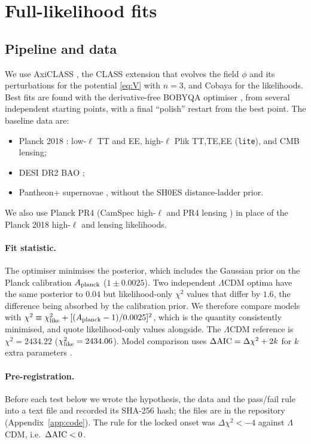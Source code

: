 \documentclass[11pt]{article}
\begin{document}
\section{Full-likelihood fits}\label{sec:fits}

\subsection{Pipeline and data}
We use AxiCLASS \cite{poulin2018,blas2011}, the CLASS extension that evolves the field
$\phi$ and its perturbations for the potential \eqref{eq:V} with $n=3$, and Cobaya
\cite{torrado2021} for the likelihoods. Best fits are found with the derivative-free
BOBYQA optimiser \cite{powell2009,cartis2019}, from several independent starting points,
with a final ``polish'' restart from the best point. The baseline data are:
\begin{itemize}
\item Planck 2018 \cite{planck2020like,planck2020lens}: low-$\ell$ TT and EE, high-$\ell$
Plik TT,TE,EE (\texttt{lite}), and CMB lensing;
\item DESI DR2 BAO \cite{desi2025};
\item Pantheon+ supernovae \cite{scolnic2022,brout2022}, without the SH0ES distance-ladder prior.
\end{itemize}
We also use Planck PR4 (CamSpec high-$\ell$ \cite{rosenberg2022} and PR4 lensing
\cite{carron2022}) in place of the Planck 2018 high-$\ell$ and lensing likelihoods.

\paragraph{Fit statistic.} The optimiser minimises the posterior, which includes the
Gaussian prior on the Planck calibration $A_{\rm planck}$ ($1\pm0.0025$). Two independent
$\Lambda$CDM optima have the same posterior to $0.04$ but likelihood-only $\chi^2$ values that
differ by $1.6$, the difference being absorbed by the calibration prior. We therefore compare
models with $\chi^2\equiv\chi^2_{\rm like}+[(A_{\rm planck}-1)/0.0025]^2$, which is the quantity
consistently minimised, and quote likelihood-only values alongside. The $\Lambda$CDM reference
is $\chi^2=2434.22$ ($\chi^2_{\rm like}=2434.06$). Model comparison uses
$\Delta{\rm AIC}=\Delta\chi^2+2k$ for $k$ extra parameters \cite{akaike1974}.

\paragraph{Pre-registration.} Before each test below we wrote the hypothesis, the data and
the pass/fail rule into a text file and recorded its SHA-256 hash; the files are in the
repository (Appendix~\ref{app:code}). The rule for the locked onset was $\Delta\chi^2<-4$
against $\Lambda$CDM, i.e.\ $\Delta{\rm AIC}<0$.
\end{document}
